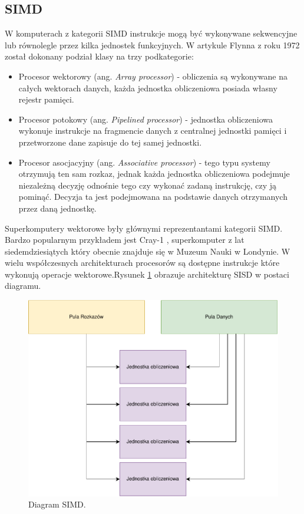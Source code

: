 \documentclass[a4paper,12pt]{book} %
\begin{document}
\subsection{SIMD}
W komputerach z kategorii SIMD instrukcje mogą być wykonywane sekwencyjne lub równolegle przez kilka jednostek funkcyjnych. W artykule Flynna z roku 1972 \cite{Flynn1972} został dokonany podział klasy na trzy podkategorie:
\begin{itemize}
	\item Procesor wektorowy (ang. \emph{Array processor}) - obliczenia są wykonywane na całych wektorach danych, każda jednostka obliczeniowa posiada własny rejestr pamięci.
	\item Procesor potokowy (ang. \emph{Pipelined processor}) - jednostka obliczeniowa wykonuje instrukcje na fragmencie danych z centralnej jednostki pamięci i przetworzone dane zapisuje do tej samej jednostki.
	\item Procesor asocjacyjny (ang. \emph{Associative processor}) - tego typu systemy otrzymują ten sam rozkaz, jednak każda jednostka obliczeniowa podejmuje niezależną decyzję odnośnie tego czy wykonać zadaną instrukcję, czy ją pominąć. Decyzja ta jest podejmowana na podstawie danych otrzymanych przez daną jednostkę.
\end{itemize}
Superkomputery wektorowe były głównymi reprezentantami kategorii SIMD. Bardzo popularnym przykładem jest Cray-1 \cite{Cray-1}, superkomputer z lat siedemdziesiątych który obecnie znajduje się w Muzeum Nauki w Londynie. W wielu współczesnych architekturach procesorów są dostępne instrukcje które wykonują operacje wektorowe.Rysunek \ref{fig:simd} obrazuje architekturę SISD w postaci diagramu.
\begin{figure}
	\centering
	\includegraphics[scale=1]{assets/SIMD.pdf}
	\caption{Diagram SIMD.}
	\label{fig:simd}
\end{figure}
\end{document}
